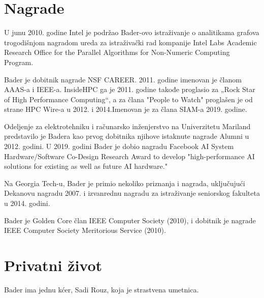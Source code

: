 \documentclass[a4paper]{article}
\begin{document}
{\section{Nagrade}
U junu 2010. godine Intel je podržao Bader-ovo istraživanje o analitikama grafova trogodišnjom nagradom ureda za istraživački rad kompanije Intel Labs Academic Research Office for the Parallel Algorithms for Non-Numeric Computing Program.

Bader je dobitnik nagrade NSF CAREER. 2011. godine imenovan je članom AAAS-a i IEEE-a. InsideHPC ga je 2011. godine takođe proglasio za „Rock Star of High Performance Computing“, a za člana "People to Watch" proglašen je od strane HPC Wire-a u 2012. i 2014.Imenovan je za člana SIAM-a 2019. godine.

Odeljenje za elektrotehniku i računarsko inženjerstvo na Univerzitetu Mariland predstavilo je Badera kao prvog dobitnika njihove istaknute nagrade Alumni u 2012. godini. U 2019. godini Bader je dobio nagradu Facebook AI System Hardware/Software Co-Design Research Award to develop "high-performance AI solutions for existing as well as future AI hardware."

Na Georgia Tech-u, Bader je primio nekoliko priznanja i nagrada, uključujući Dekanovu nagradu 2007. i izvanrednu nagradu za istraživanje seniorskog fakulteta u 2014. godini.

Bader je Golden Core član IEEE Computer Society (2010), i dobitnik je nagrade IEEE Computer Society Meritorious Service (2010).

\section{Privatni život}
Bader ima jednu kćer, Sadi Rouz, koja je strastvena umetnica.

\newpage

}
\end{document}
